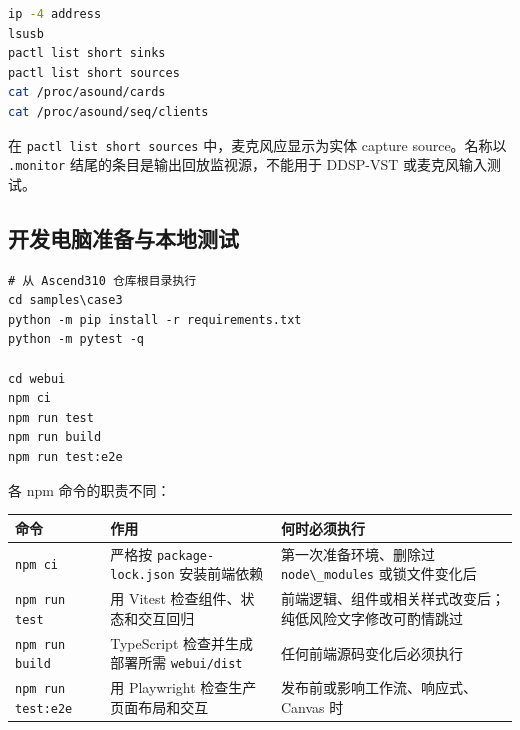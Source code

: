 \begin{lstlisting}[language=bash]
ip -4 address
lsusb
pactl list short sinks
pactl list short sources
cat /proc/asound/cards
cat /proc/asound/seq/clients
\end{lstlisting}

在 \passthrough{\lstinline!pactl list short sources!}
中，麦克风应显示为实体 capture source。名称以
\passthrough{\lstinline!.monitor!} 结尾的条目是输出回放监视源，不能用于
DDSP-VST 或麦克风输入测试。

\subsection{开发电脑准备与本地测试}\label{src-experiment-case3-local-setup}

\begin{lstlisting}
# 从 Ascend310 仓库根目录执行
cd samples\case3
python -m pip install -r requirements.txt
python -m pytest -q

cd webui
npm ci
npm run test
npm run build
npm run test:e2e
\end{lstlisting}

各 npm 命令的职责不同：

\begin{longtable}[]{@{}
  >{\raggedright\arraybackslash}p{}
  >{\raggedright\arraybackslash}p{}
  >{\raggedright\arraybackslash}p{}@{}}
\toprule\noalign{}
\begin{minipage}[b]{\linewidth}\raggedright
命令
\end{minipage} & \begin{minipage}[b]{\linewidth}\raggedright
作用
\end{minipage} & \begin{minipage}[b]{\linewidth}\raggedright
何时必须执行
\end{minipage} \\
\midrule\noalign{}
\endhead
\bottomrule\noalign{}
\endlastfoot
\passthrough{\lstinline!npm ci!} & 严格按
\passthrough{\lstinline!package-lock.json!} 安装前端依赖 &
第一次准备环境、删除过 \passthrough{\lstinline!node\_modules!}
或锁文件变化后 \\
\passthrough{\lstinline!npm run test!} & 用 Vitest
检查组件、状态和交互回归 &
前端逻辑、组件或相关样式改变后；纯低风险文字修改可酌情跳过 \\
\passthrough{\lstinline!npm run build!} & TypeScript 检查并生成部署所需
\passthrough{\lstinline!webui/dist!} & 任何前端源码变化后必须执行 \\
\passthrough{\lstinline!npm run test:e2e!} & 用 Playwright
检查生产页面布局和交互 & 发布前或影响工作流、响应式、Canvas 时 \\
\end{longtable}

